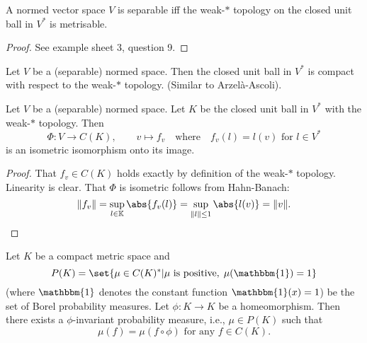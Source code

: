 \documentclass{article}
\newcommand{\K}{\mathbb{K}}
\begin{document}
\begin{thm}
    A normed vector space $V$ is separable iff the weak-$*$ topology on the closed unit ball in $V^*$ is metrisable.
\end{thm}

\begin{proof}
    See example sheet 3, question 9.
\end{proof}

\begin{thm}
    Let $V$ be a (separable) normed space.
    Then the closed unit ball in $V^*$ is compact with respect to the weak-$*$ topology. (Similar to Arzel\`a-Ascoli).
\end{thm}

\begin{thm}
    Let $V$ be a (separable) normed space. Let $K$ be the closed unit ball in $V^*$ with the weak-$*$ topology.
    Then
    \begin{equation*}
        \Phi: V \to C(K), \qquad v \mapsto f_v \quad \text{where} \quad f_v(l) = l(v) \text{ for } l \in V^*
    \end{equation*}
    is an isometric isomorphism onto its image.
\end{thm}

\begin{proof}
    That $f_v \in C(K)$ holds exactly by definition of the weak-$*$ topology.
    Linearity is clear. That $\Phi$ is isometric follows from Hahn-Banach:
    \begin{equation*}
        \|f_v\| = \sup_{l \in \K} \abs{f_v(l)} = \sup_{\|l\| \leq 1} \abs{l(v)} = \|v\|. \qedhere
    \end{equation*}
\end{proof}

\begin{eg}
    Let $K$ be a compact metric space and
    \begin{equation*}
        P(K) = \set{\mu \in C(K)^* | \mu \text{ is positive}, \; \mu(\mathbbm{1}) = 1}
    \end{equation*}
    (where $\mathbbm{1}$ denotes the constant function $\mathbbm{1}(x) = 1$) be the set of Borel probability measures.
    Let $\phi: K \to K$ be a homeomorphism. Then there exists a $\phi$-invariant probability measure, i.e., $\mu \in P(K)$ such that
    \begin{equation*}
        \mu(f) = \mu(f \circ \phi) \text{ for any }f \in C(K).
    \end{equation*}
\end{eg}
\end{document}

